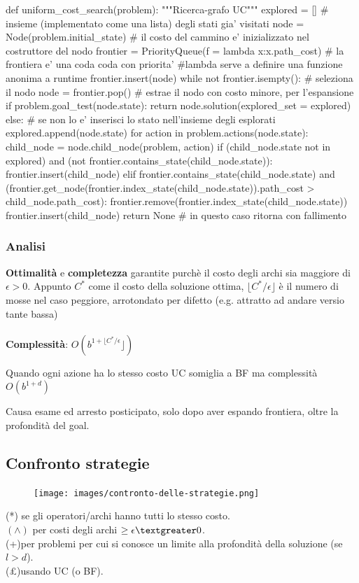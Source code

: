 \begin{python}
	def uniform_cost_search(problem): """Ricerca-grafo UC"""
		explored = [] # insieme (implementato come una lista) degli stati gia' visitati
		node = Node(problem.initial_state) # il costo del cammino e' inizializzato nel costruttore del nodo
		frontier = PriorityQueue(f = lambda x:x.path_cost) # la frontiera e' una coda coda con priorita'
		#lambda serve a definire una funzione anonima a runtime
		frontier.insert(node)
		while not frontier.isempty():
			# seleziona il nodo node = frontier.pop() # estrae il nodo con costo minore, per l'espansione
			if problem.goal_test(node.state):
				return node.solution(explored_set = explored)
			else: 
				# se non lo e' inserisci lo stato nell'insieme degli esplorati
				explored.append(node.state)
				for action in problem.actions(node.state):
					child_node = node.child_node(problem, action)
					if (child_node.state not in explored) and (not frontier.contains_state(child_node.state)):
						frontier.insert(child_node)
					elif frontier.contains_state(child_node.state) and 
						(frontier.get_node(frontier.index_state(child_node.state)).path_cost > child_node.path_cost):
						frontier.remove(frontier.index_state(child_node.state))
						frontier.insert(child_node)
		return None # in questo caso ritorna con fallimento
\end{python}

\subsubsection{Analisi}
\textbf{Ottimalità} e \textbf{completezza} garantite purchè il costo degli archi sia maggiore di $\epsilon > 0$.
Appunto $C^*$ come il costo della soluzione ottima, $\lfloor C^*/\epsilon \rfloor$ è il numero 
di mosse nel caso peggiore, arrotondato per difetto (e.g. attratto ad andare versio tante bassa)\\\\
\textbf{Complessità}: $O(b^{1+\lfloor C^*/\epsilon}\rfloor)$
\begin{note}
	Quando ogni azione ha lo stesso costo UC somiglia a BF ma complessità $O(b^{1+d})$
\end{note}
\hspace{-15pt}Causa esame ed arresto posticipato, solo dopo aver espando frontiera, oltre la profondità del goal.

\subsection{Confronto strategie}
\begin{figure}[h!]
	\centering
	\texttt{[image: images/contronto-delle-strategie.png]}
\end{figure}

\hspace{-15pt}(*) se gli operatori/archi hanno tutti lo stesso costo.\\
$(\wedge)$ per costi degli archi $\geq \epsilon \textgreater 0$.\\
(+)per problemi per cui si conosce un limite alla profondità della soluzione (se $l>d$).\\
(£)usando UC (o BF).